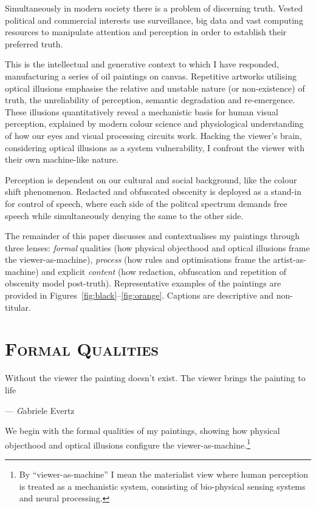 \documentclass[12pt]{article}
\newcommand{\epigraphsource}[1]{--- {\small\textit #1}}
\begin{document}
Simultaneously in modern society there is a problem of discerning
truth.\autocite{keyes2004posttruth,mcintyre2018posttruth} Vested
political and commercial interests use surveillance, big data and vast
computing resources to manipulate attention and perception in order to
establish their preferred truth.

This is the intellectual and generative context to which I have
responded, manufacturing a series of oil paintings on
canvas. Repetitive artworks utilising optical illusions emphasise the
relative and unstable nature (or non-existence) of truth, the
unreliability of perception, semantic degradation and
re-emergence. These illusions quantitatively reveal a mechanistic
basis for human visual perception, explained by modern colour science
and physiological understanding of how our eyes and visual processing
circuits work. Hacking the viewer's brain, considering optical
illusions as a system vulnerability, I confront the viewer with their
own machine-like nature.

Perception is dependent on our cultural and social background, like
the colour shift phenomenon. Redacted and obfuscated obscenity is
deployed as a stand-in for control of speech, where each side of the
politcal spectrum demands free speech while simultaneously denying the
same to the other side.

The remainder of this paper discusses and contextualises my paintings
through three lenses: \emph{formal} qualities (how physical objecthood
and optical illusions frame the viewer-as-machine), \emph{process}
(how rules and optimisations frame the artist-as-machine) and
explicit \emph{content} (how redaction, obfuscation and repetition of
obscenity model post-truth). Representative examples of the paintings
are provided in Figures~\ref{fig:black}--\ref{fig:orange}. Captions
are descriptive and non-titular.

\section{\textsc{Formal Qualities}}
\epigraph{Without the viewer the painting doesn't exist. The viewer brings
the painting to life}{\epigraphsource{Gabriele Evertz}}
  
We begin with the formal qualities of my paintings, showing how
physical objecthood and optical illusions configure the
viewer-as-machine.\footnote{By ``viewer-as-machine'' I mean the
  materialist view where human perception is treated as a mechanistic
  system, consisting of bio-physical sensing systems and neural
  processing.}
\end{document}
